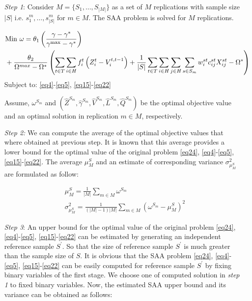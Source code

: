 \documentclass[review]{elsarticle}
\begin{document}
\begin{itemize}
\item[\textit{Step 1}:] Consider $M=\{ S_{1} ,\ldots,S_{|M|} \} $ as a set of $M$  replications with sample size $|S|$ i.e. $s_{1}^{m}, \ldots, s_{|S|}^{m} $ for $m\in M$. The SAA problem is solved for $M$ replications.

\begin{align*} 
&{\rm Min}~\omega ={\theta }_1\left(\frac{\gamma -{\gamma }^*}{{\gamma }^{\max}-{\gamma }^*}\right)\\
&+\frac{\theta_2 }{{\Omega }^{max}-{\Omega }^*}\left({\sum_{t\in T}{\sum_{i\in H}{f^t_i\left(Z^t_i-V^{t,t-1}_i\right)}}+\frac{1}{|S|}\sum_{t\in T}\sum_{i\in H}\sum_{j\in H}\sum_{s\in S_m}w^{st}_i c^{st}_{ij}X^{st}_{ij}-{\Omega }^*}\right)
\end{align*} 
Subject to: \eqref{eq4}-\eqref{eq5}, \eqref{eq15}-\eqref{eq22}

Assume, $\omega ^{S_{m} } $ and $(\widehat{Z}^{S_{m} }, \widehat{\gamma }^{S_{m} }, \widehat{V}^{S_{m} }, \widehat{L}^{S_{m} }, \widehat{Q}^{S_{m} } )$ be the optimal objective value and an optimal solution in replication $m\in M$, respectively.

\item[\textit{Step 2: }] We can compute the average of the optimal objective values that where obtained at previous step. It is known that this average provides a lower bound for the optimal value of the original problem \eqref{eq24}, \eqref{eq4}-\eqref{eq5}, \eqref{eq15}-\eqref{eq22}. The average $\mu _{M}^{S} $ and an estimate of corresponding variance $\sigma _{\mu _{M}^{S}}^{2} $are formulated as follow:

\begin{align} 
&\mu _{M}^{S} =\frac{1}{|M|} \sum _{m\in M}\omega ^{S_{m} }\label{eq25}\\
&\sigma _{\mu _{M}^{S}}^{2} =\frac{1}{\left(|M|-1\right)|M|} \sum _{m\in M}\left(\omega ^{S_{m} } -
\mu_{M}^{S} \right)^{2}\label{eq26}
\end{align}

\item[\textit{Step 3}:] An upper bound for the optimal value of the original problem \eqref{eq24}, \eqref{eq4}-\eqref{eq5}, \eqref{eq15}-\eqref{eq22} can be estimated by generating an independent reference sample $S^{'} $. So that the size of reference sample $S^{'} $ is much greater than the sample size of $S$. It is obvious that the SAA problem \eqref{eq24}, \eqref{eq4}-\eqref{eq5}, \eqref{eq15}-\eqref{eq22} can be easily computed for reference sample $S^{'} $ by fixing binary variables of the first stage. We choose one of computed solution in \textit{step 1} to fixed binary variables. Now, the estimated SAA upper bound and its variance can be obtained as follows:


\end{itemize}
\end{document}
